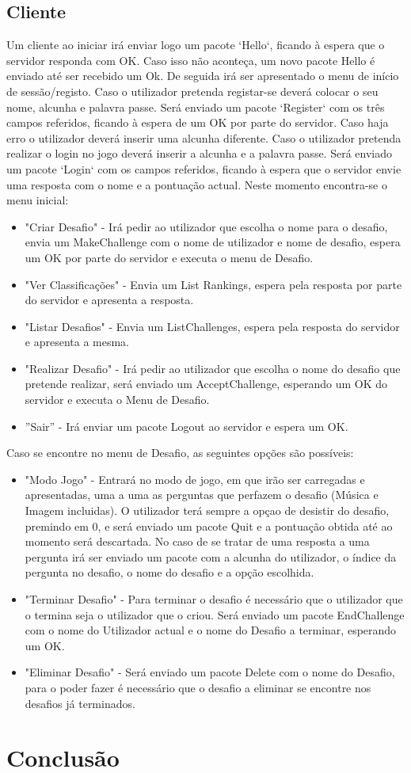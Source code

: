 \documentclass{llncs}
\begin{document}
\subsection{Cliente}
Um cliente ao iniciar irá enviar logo um pacote `Hello`, ficando à espera que o servidor responda com OK. Caso isso não aconteça, um novo pacote Hello é enviado até ser recebido um Ok.
De seguida irá ser apresentado o menu de início de sessão/registo. Caso o utilizador pretenda registar-se deverá colocar o seu nome, alcunha e palavra passe. Será enviado um pacote `Register` com os três campos referidos, ficando à espera de um OK por parte do servidor. Caso haja erro o utilizador deverá inserir uma alcunha diferente. Caso o utilizador pretenda realizar o login no jogo deverá inserir a alcunha e a palavra passe. Será enviado um pacote `Login` com os campos referidos, ficando à espera que o servidor envie uma resposta com o nome e a pontuação actual. Neste momento encontra-se o menu inicial:
\begin{itemize}
\item "Criar Desafio" - Irá pedir ao utilizador que escolha o nome para o desafio, envia um MakeChallenge com o nome de utilizador e nome de desafio, espera um OK por parte do servidor e executa o menu de Desafio.
\item "Ver Classificações" - Envia um List Rankings, espera pela resposta por parte do servidor e apresenta a resposta.
\item "Listar Desafios" - Envia um ListChallenges, espera pela resposta do servidor e apresenta a mesma.
\item "Realizar Desafio" - Irá pedir ao utilizador que escolha o nome do desafio que pretende realizar, será enviado um AcceptChallenge, esperando um OK do servidor e executa o Menu de Desafio.
\item ''Sair'' - Irá enviar um pacote Logout ao servidor e espera um OK.
\end{itemize}
Caso se encontre no menu de Desafio, as seguintes opções são possíveis:
\begin{itemize}
\item "Modo Jogo" - Entrará no modo de jogo, em que irão ser carregadas e apresentadas, uma a uma as perguntas que perfazem o desafio (Música e Imagem incluidas). O utilizador terá sempre a opçao de desistir do desafio, premindo em 0, e será enviado um pacote Quit e a pontuação obtida até ao momento será descartada. No caso de se tratar de uma resposta a uma pergunta irá ser enviado um pacote com a alcunha do utilizador, o índice da pergunta no desafio, o nome do desafio e a opção escolhida.
\item "Terminar Desafio" - Para terminar o desafio é necessário que o utilizador que o termina seja o utilizador que o criou. Será enviado um pacote EndChallenge com o nome do Utilizador actual e o nome do Desafio a terminar, esperando um OK.
\item "Eliminar Desafio" - Será enviado um pacote Delete com o nome do Desafio, para o poder fazer é necessário que o desafio a eliminar se encontre nos desafios já terminados.
\end{itemize}

\section{Conclusão}
\end{document}
